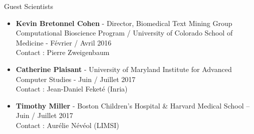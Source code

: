 \begin{frame}{Guest Scientists}

\begin{itemize}
\item 
\textbf{Kevin Bretonnel Cohen} - Director, Biomedical Text Mining Group Computational Bioscience
Program / University of Colorado School of Medicine  - Février / Avril 2016
\\
Contact : Pierre Zweigenbaum
\item 
\textbf{Catherine Plaisant} - University of Maryland Institute for Advanced Computer Studies -
Juin / Juillet 2017
\\
Contact : Jean-Daniel Feketé (Inria)
\item
\textbf{Timothy Miller} - Boston Children's Hospital \& Harvard Medical School – Juin / Juillet 2017
\\
Contact : Aurélie Névéol (LIMSI)
\end{itemize}
\end{frame}

